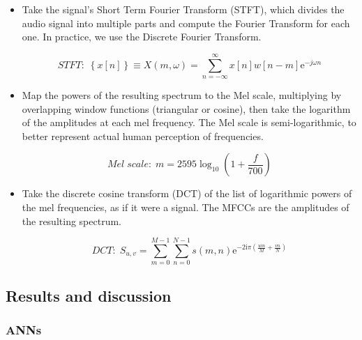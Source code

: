 \documentclass[11pt]{article}
\begin{document}
\begin{itemize}
  \item Take the signal's Short Term Fourier Transform (STFT), which divides the audio signal into multiple parts and compute the Fourier Transform for each one. In practice, we use the Discrete Fourier Transform.

        \begin{equation}
          STFT: \;\left\{ x[ n ] \right\} \equiv X(m,\omega) = \sum_{n=-\infty}^{\infty} x[n]w[n-m]\mathrm{e}^{-j \omega n}
        \end{equation}

  \item Map the powers of the resulting spectrum to the Mel scale, multiplying by overlapping window functions (triangular or cosine), then take the logarithm of the amplitudes at each mel frequency. The Mel scale is semi-logarithmic, to better represent actual human perception of frequencies.

        \begin{equation}
          Mel \; scale: \; m = 2595 \log_{10}\left(1 + \frac{f}{700}\right)
        \end{equation}

  \item Take the discrete cosine transform (DCT) of the list of logarithmic powers of the mel frequencies, as if it were a signal. The MFCCs are the amplitudes of the resulting spectrum.

        \begin{equation}
          DCT: \; S_{u,v} = \sum_{m = 0}^{M- 1} \sum_{n = 0}^{N- 1} s(m, n)\mathrm e^{-2\mathrm i\pi \left ( \frac{um}M+ \frac{vn}N\right )}
        \end{equation}

\end{itemize}



\subsection{Results and discussion}

\subsubsection*{ANNs}
\end{document}
